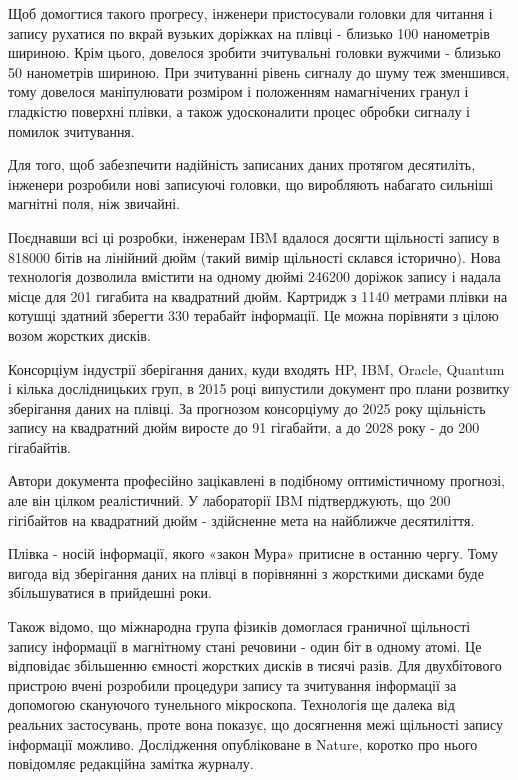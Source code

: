 \documentclass[a4paper,14pt]{extreport}
\begin{document}
Щоб домогтися такого прогресу, інженери пристосували головки для читання і запису рухатися по вкрай вузьких доріжках на плівці - близько 100 нанометрів шириною. Крім цього, довелося зробити зчитувальні головки вужчими - близько 50 нанометрів шириною. При зчитуванні рівень сигналу до шуму теж зменшився, тому довелося маніпулювати розміром і положенням намагнічених гранул і гладкістю поверхні плівки, а також удосконалити процес обробки сигналу і помилок зчитування.\par

Для того, щоб забезпечити надійність записаних даних протягом десятиліть, інженери розробили нові записуючі головки, що виробляють набагато сильніші магнітні поля, ніж звичайні.\par

Поєднавши всі ці розробки, інженерам IBM вдалося досягти щільності запису в 818000 бітів на лінійний дюйм (такий вимір щільності склався історично). Нова технологія дозволила вмістити на одному дюймі 246200 доріжок запису і надала місце для 201 гигабита на квадратний дюйм. Картридж з 1140 метрами плівки на котушці здатний зберегти 330 терабайт інформації. Це можна порівняти з цілою возом жорстких дисків.\par

Консорціум індустрії зберігання даних, куди входять HP, IBM, Oracle, Quantum\cite{lit2} і кілька дослідницьких груп, в 2015 році випустили документ про плани розвитку зберігання даних на плівці. За прогнозом консорціуму до 2025 року щільність запису на квадратний дюйм виросте до 91 гігабайти, а до 2028 року - до 200 гігабайтів.\par

Автори документа професійно зацікавлені в подібному оптимістичному прогнозі, але він цілком реалістичний. У лабораторії IBM підтверджують, що 200 гігібайтов на квадратний дюйм - здійсненне мета на найближче десятиліття.\par

Плівка - носій інформації, якого «закон Мура» притисне в останню чергу. Тому вигода від зберігання даних на плівці в порівнянні з жорсткими дисками буде збільшуватися в прийдешні роки.\par

Також відомо, що міжнародна група фізиків домоглася граничної щільності запису інформації в магнітному стані речовини - один біт в одному атомі. Це відповідає збільшенню ємності жорстких дисків в тисячі разів. Для двухбітового пристрою вчені розробили процедури запису та зчитування інформації за допомогою скануючого тунельного мікроскопа. Технологія ще далека від реальних застосувань, проте вона показує, що досягнення межі щільності запису інформації можливо. Дослідження опубліковане в Nature, коротко про нього повідомляє редакційна замітка журналу\cite{lit3}.\par
\end{document}
